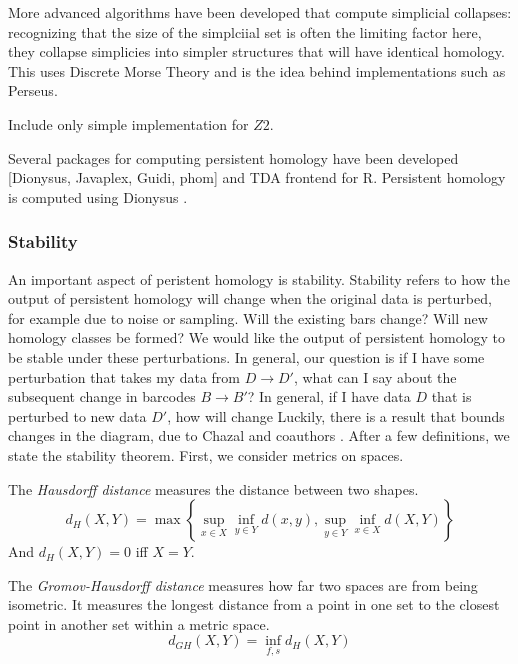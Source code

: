 More advanced algorithms have been developed that compute simplicial collapses: recognizing that the size of the simplciial set is often the limiting factor here, they collapse simplicies into simpler structures that will have identical homology.
This uses Discrete Morse Theory and is the idea behind implementations such as Perseus.

Include only simple implementation for $Z2$.

Several packages for computing persistent homology have been developed [Dionysus, Javaplex, Guidi, phom] and TDA frontend for R.
Persistent homology is computed using Dionysus \cite{Morozov:2012}.

\subsubsection{Stability}
\label{subsubsec:ph_stability}

An important aspect of peristent homology is stability.
Stability refers to how the output of persistent homology will change when the original data is perturbed, for example due to noise or sampling.
Will the existing bars change?
Will new homology classes be formed?
We would like the output of persistent homology to be stable under these perturbations.
In general, our question is if I have some perturbation that takes my data from $D\rightarrow D'$, what can I say about the subsequent change in barcodes $B\rightarrow B'$?
In general, if I have data $D$ that is perturbed to new data $D'$, how will change
Luckily, there is a result that bounds changes in the diagram, due to Chazal and coauthors \citep{Chazal:2009wc}.
After a few definitions, we state the stability theorem.
First, we consider metrics on spaces.

\begin{defn}
\label{defn:hausdorff}
The \emph{Hausdorff distance} measures the distance between two shapes.
\begin{equation}
d_{H}(X,Y) = \max\left\{ \sup_{x \in X} \inf_{y \in Y} d(x,y), \sup_{y \in Y} \inf_{x \in X} d(X,Y) \right\}
\end{equation}
And $d_H(X,Y)=0$ iff $X=Y$.
\end{defn}

\begin{defn}
\label{defn:gromovhausdorff}
The \emph{Gromov-Hausdorff distance} measures how far two spaces are from being isometric.
It measures the longest distance from a point in one set to the closest point in another set within a metric space.
\begin{equation}
d_{GH}(X,Y)=\inf_{f,s} d_H(X,Y)
\end{equation}
\end{defn}

